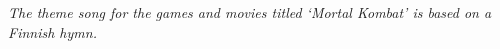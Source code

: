 \clearpage
\thispagestyle{empty}
\hspace{0pt}
\vfill
\textit{The theme song for the games and movies titled `Mortal Kombat' is based on a Finnish hymn.}
\vfill
\clearpage
